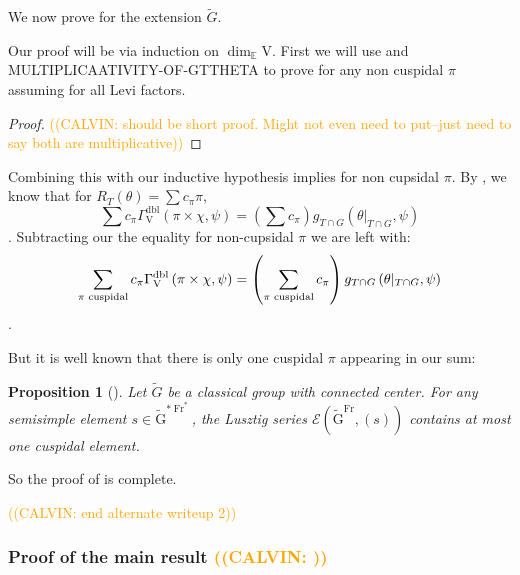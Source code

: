 \documentclass[12pt, reqno]{amsart}
\newtheorem{proposition}[theorem]{Proposition}
\theoremstyle{definition}
\theoremstyle{definition}
\theoremstyle{definition}
\newcommand{\hermitianSpace}{\mathrm{V}}
\newcommand{\fieldCharacter}{\psi}
\newcommand{\GroupExtension}[1]{\widetilde{#1}}
\newcommand{\quadraticExtension}{\mathbb{E}}
\newcommand{\Frobenius}{\operatorname{Fr}}
\newcommand{\dblGammaFactorSpace}[4]{\Gamma^{\mathrm{dbl}}_{#1}\left(#2 \times #3, #4\right)}
\newcommand{\algebraicGroup}[1]{\boldsymbol{\mathrm{#1}}}
\newcommand{\LusztigSeries}[2]{\mathcal{E}\left(#1, (#2)\right)}
\newcommand{\DualFrobeniusFixedPoints}[2][\Frobenius^{\ast}]{\algebraicGroup{#2}^{\ast #1}}
\newcommand{\FrobeniusFixedPoints}[2][\Frobenius]{\algebraicGroup{#2}^{#1}}
\newcommand{\calvin}[1]{\textcolor{orange}{\sffamily ((CALVIN: #1))}}
\begin{document}
We now prove  for the extension $\GroupExtension{G}$.

Our proof will be via induction on $\dim_{\quadraticExtension} \hermitianSpace$. First we will use   and MULTIPLICAATIVITY-OF-GTTHETA to prove  for any non cuspidal $\pi$ assuming  for all Levi factors. \\

\begin{proof}
\calvin{should be short proof. Might not even need to put--just need to say both are multiplicative}
\end{proof}

Combining this with our inductive hypothesis implies  for non cupsidal $\pi$.
By , we know that for $R_T(\theta) = \sum c_{\pi} \pi$, 
$$\sum c_{\pi} \dblGammaFactorSpace{\hermitianSpace}{\pi}{\chi}{\fieldCharacter} = (\sum c_{\pi})g_{T \cap G}\left(\theta|_{T \cap G}, \fieldCharacter\right)$$. Subtracting our the equality for non-cupsidal $\pi$ we are left with:
$$ \sum_{\pi \textnormal{ cuspidal}} c_{\pi} \dblGammaFactorSpace{\hermitianSpace}{\pi}{\chi}{\fieldCharacter} = \left(\sum_{\pi \textnormal{ cuspidal}} c_{\pi}\right)g_{T \cap G}\left(\theta|_{T \cap G}, \fieldCharacter\right)$$.

But it is well known that there is only one cuspidal $\pi$ appearing in our sum:
\begin{proposition}[{\cite[Page 172]{Lusztig1977}}]
	Let $\GroupExtension{G}$ be a classical group with connected center. For any semisimple element $s \in \DualFrobeniusFixedPoints{\GroupExtension{G}}$, the Lusztig series $\LusztigSeries{\FrobeniusFixedPoints{\GroupExtension{G}}}{s}$ contains at most one cuspidal element.
\end{proposition}

So the proof of  is complete.

\calvin{end alternate writeup 2}


\subsubsection{Proof of the main result \calvin{}}
\end{document}

